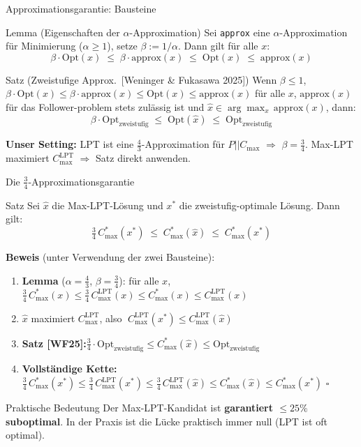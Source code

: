 \documentclass[fleqn,11pt,aspectratio=43]{beamer}
\newcommand{\Cmax}{C_{\max}}
\newcommand{\Copt}{C_{\max}^{*}}
\newcommand{\Clpt}{C_{\max}^{\mathrm{LPT}}}
\begin{document}
\begin{frame}[shrink=15]{Approximationsgarantie: Bausteine}
  \begin{block}{Lemma (Eigenschaften der $\alpha$-Approximation)}
    \vspace{-0.2em}
    \small Sei \texttt{approx} eine $\alpha$-Approximation für Minimierung ($\alpha\geq 1$), setze $\beta:=1/\alpha$. Dann gilt für alle $x$:
    \[\beta\cdot\mathrm{Opt}(x)\;\leq\;\beta\cdot\mathrm{approx}(x)\;\leq\;\mathrm{Opt}(x)\;\leq\;\mathrm{approx}(x)\]
    \vspace{-0.3em}
  \end{block}
  \begin{block}{Satz (Zweistufige Approx.\ [Weninger \& Fukasawa 2025])}
    \vspace{-0.2em}
    \small Wenn $\beta \leq 1$, $\beta\cdot\mathrm{Opt}(x)\leq\beta\cdot\mathrm{approx}(x)\leq\mathrm{Opt}(x)\leq\mathrm{approx}(x)$ für alle $x$, $\mathrm{approx}(x)$ für das Follower-problem stets zulässig ist und $\hat x\in\arg\max_x\,\mathrm{approx}(x)$, dann:
    \[\beta\cdot\mathrm{Opt}_{\text{zweistufig}}\;\leq\;\mathrm{Opt}(\hat x)\;\leq\;\mathrm{Opt}_{\text{zweistufig}}\]
    \vspace{-0.3em}
  \end{block}
  \textbf{Unser Setting:} LPT ist eine $\tfrac{4}{3}$-Approximation für $P||\Cmax$ $\Rightarrow$ $\beta=\tfrac{3}{4}$. Max-LPT maximiert $\Clpt$ $\Rightarrow$ Satz direkt anwenden.
\end{frame}

\begin{frame}[shrink=14]{Die $\frac{3}{4}$-Approximationsgarantie}
  \begin{block}{Satz}
    Sei $\hat x$ die Max-LPT-Lösung und $x^*$ die zweistufig-optimale Lösung. Dann gilt:
    \[\tfrac{3}{4}\,\Copt(x^*)\;\leq\;\Copt(\hat x)\;\leq\;\Copt(x^*)\]
  \end{block}
  \textbf{Beweis} (unter Verwendung der zwei Bausteine):
  \begin{enumerate}\small
    \item \textbf{Lemma} ($\alpha=\tfrac{4}{3}$, $\beta=\tfrac{3}{4}$): für alle $x$,\quad $\tfrac34\,\Copt(x)\leq\tfrac34\,\Clpt(x)\leq\Copt(x)\leq\Clpt(x)$
    \item $\hat x$ maximiert $\Clpt$, also $\;\Clpt(x^*)\leq\Clpt(\hat x)$
    \item \textbf{Satz [WF25]:}\quad $\tfrac{3}{4}\cdot\mathrm{Opt}_{\text{zweistufig}}\leq\Copt(\hat x)\leq\mathrm{Opt}_{\text{zweistufig}}$
    \item \textbf{Vollständige Kette:}\quad $\tfrac34\,\Copt(x^*)\leq\tfrac34\,\Clpt(x^*)\leq\tfrac34\,\Clpt(\hat x)\leq\Copt(\hat x)\leq\Copt(x^*)$ \hfill$\square$
  \end{enumerate}
  \begin{alertblock}{Praktische Bedeutung}
    Der Max-LPT-Kandidat ist \textbf{garantiert $\leq 25\%$ suboptimal}.
    In der Praxis ist die Lücke praktisch immer null (LPT ist oft optimal).
  \end{alertblock}
\end{frame}
\end{document}
